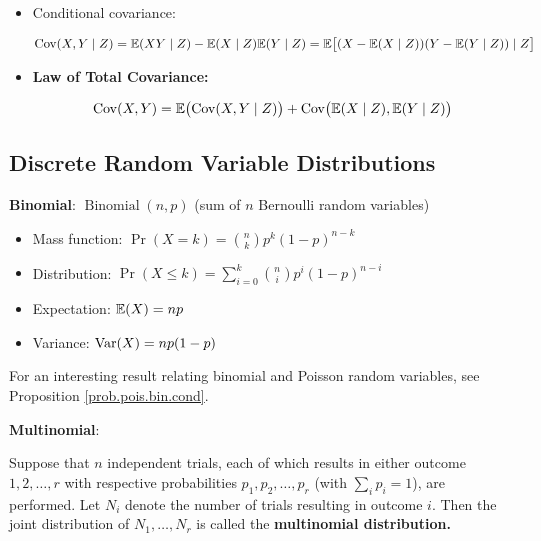 \begin{itemize}
\begin{itemize}
\begin{theorem}
\begin{enumerate}[(a)]
\end{enumerate}
\end{theorem}

\item \begin{definition} Conditional covariance: 

\[
\mathrm{Cov}(X, Y \mid Z) = \mathbb{E}(XY \mid Z) - \mathbb{E}(X \mid Z) \mathbb{E}(Y \mid Z) = \mathbb{E} \big[ (X - \mathbb{E}(X \mid Z))(Y - \mathbb{E}(Y \mid Z)) \mid Z\big]
\] \end{definition}

\item \begin{theorem} \textbf{Law of Total Covariance:}

\[
\mathrm{Cov}(X, Y) = \mathbb{E}\big(\mathrm{Cov}(X, Y \mid Z) \big) + \mathrm{Cov} \big(\mathbb{E}(X \mid Z), \mathbb{E}(Y \mid Z) \big)
\]
\end{theorem}

\end{itemize}

\end{itemize}

\subsection{Discrete Random Variable Distributions}

\textbf{Binomial}: \(\operatorname{Binomial}(n, p)\) (sum of \(n\) Bernoulli random variables)

\begin{itemize}

\item Mass function: \(\Pr(X = k) = \binom{n}{k}p^k(1-p)^{n-k}  \)

\item Distribution: \(\Pr(X \leq k) = \sum_{i=0}^k \binom{n}{i}p^i(1-p)^{n-i} \)

\item Expectation: \(\mathbb{E}(X) = np \)

\item Variance: \(\mathrm{Var}(X) = np(1-p) \)

\end{itemize}

For an interesting result relating binomial and Poisson random variables, see Proposition \ref{prob.pois.bin.cond}.

\textbf{Multinomial}: 

\begin{definition}\label{prob.ross.multinomial.dist.def} Suppose that \(n\) independent trials, each of which results in either outcome \(1, 2, \ldots, r\) with respective probabilities \(p_1, p_2, \ldots, p_r\) (with \(\sum_{i} p_i = 1\)), are performed. Let \(N_i\) denote the number of trials resulting in outcome \(i\). Then the joint distribution of \(N_1, \ldots, N_r\) is called the \textbf{multinomial distribution.}

\end{definition}

